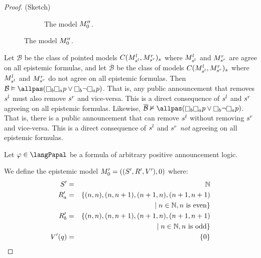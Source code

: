 \begin{proof}{(Sketch)}
\begin{figure}
\begin{subfigure}[t]{\linewidth}
        \caption{The model $\kPModel[\prime\prime]{0}$.}\label{expressivity-s5-3}
    \end{subfigure}
\end{figure}

Let $\mathcal{B}$ be the class of pointed models $C(\kPModel[l]{\kStateS[l]},\kPModel[r]{\kStateS[r]})_{\kStateS}$ where $\kPModel[l]{\kStateS[l]}$ and $\kPModel[r]{\kStateS[r]}$ are agree on all epistemic formulas, and let $\overline{\mathcal{B}}$ be the class of models $C(\kPModel[l]{\kStateS[l]},\kPModel[r]{\kStateS[r]})_{\kStateS}$ where $\kPModel[l]{\kStateS[l]}$ and $\kPModel[r]{\kStateS[r]}$ do not agree on all epistemic formulas. 
Then $\mathcal{B} \entails \allpas(\knows[\agentB] \knows[\agentA] \atomP \lor \knows[\agentB] \neg \knows[\agentA] \atomP)$.
That is, any public announcement that removes $\kStateS[l]$ must also remove $\kStateS[r]$ and vice-versa. 
This is a direct consequence of $\kStateS[l]$ and $\kStateS[r]$ agreeing on all epistemic formulas.
Likewise, $\overline{\mathcal{B}} \nentails \allpas(\knows[\agentB] \knows[\agentA] \atomP \lor \knows[\agentB] \neg \knows[\agentA] \atomP)$.
That is, there is a public announcement that can remove $\kStateS[l]$ without removing $\kStateS[r]$ and vice-versa.
This is a direct consequence of $\kStateS[l]$ and $\kStateS[r]$ {\em not} agreeing on all epistemic formulas.

Let $\phi \in \langPapal$ be a formula of arbitrary positive announcement logic.

We define the epistemic model $\kPModelAndTuple[\prime]{0}$ where:
\begin{eqnarray*}
    \kStates[\prime] &=& \naturals\\
    \kAccessibility[\prime]{\agentA} &=& \{(n, n), (n, n + 1), (n + 1, n), (n + 1, n + 1) \\&&\quad \mid n \in \naturals, n \text{ is even}\}\\
    \kAccessibility[\prime]{\agentB} &=& \{(n, n), (n, n + 1), (n + 1, n), (n + 1, n + 1) \\&&\quad \mid n \in \naturals, n \text{ is odd}\}\\
    \kValuation[\prime](\atomQ) &=& \{0\}
\end{eqnarray*}


\end{proof}
